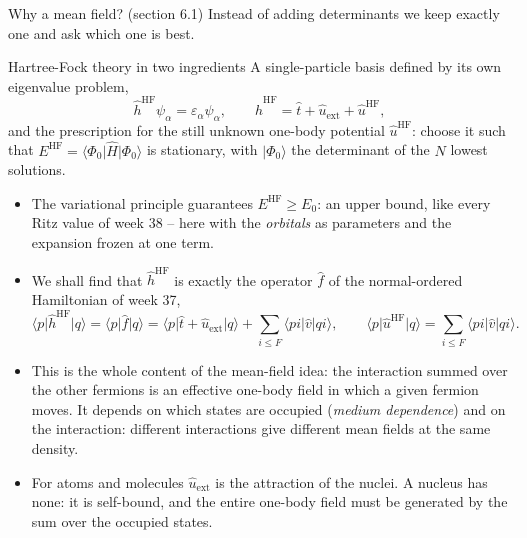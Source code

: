\documentclass[aspectratio=169,10pt]{beamer}
\newcommand{\ket}[1]{\vert #1\rangle}
\newcommand{\bra}[1]{\langle #1\vert}
\newcommand{\element}[3]{\langle #1\vert #2\vert #3\rangle}
\begin{document}
\begin{frame}{Why a mean field? (section 6.1)}
  \footnotesize
  Instead of adding determinants we keep exactly one and ask which one is best.
  \begin{block}{Hartree-Fock theory in two ingredients}
    A single-particle basis defined by its own eigenvalue problem,
    \[
      \hat{h}^{\mathrm{HF}}\psi_\alpha=\varepsilon_\alpha\psi_\alpha,\qquad
      \hat{h}^{\mathrm{HF}}=\hat{t}+\hat{u}_{\mathrm{ext}}+\hat{u}^{\mathrm{HF}},
    \]
    and the prescription for the still unknown one-body potential $\hat{u}^{\mathrm{HF}}$: choose it such that $E^{\mathrm{HF}}=\bra{\Phi_0}\hat{H}\ket{\Phi_0}$ is stationary, with $\ket{\Phi_0}$ the determinant of the $N$ lowest solutions.
  \end{block}
  \begin{itemize}
    \item The variational principle guarantees $E^{\mathrm{HF}}\ge E_0$: an upper bound, like every Ritz value of week 38 -- here with the \emph{orbitals} as parameters and the expansion frozen at one term.
    \item We shall find that $\hat{h}^{\mathrm{HF}}$ is exactly the operator $\hat{f}$ of the normal-ordered Hamiltonian of week 37,
    \[
      \element{p}{\hat{h}^{\mathrm{HF}}}{q}=\element{p}{\hat{f}}{q}=\element{p}{\hat{t}+\hat{u}_{\mathrm{ext}}}{q}+\sum_{i\le F}\element{pi}{\hat{v}}{qi},
      \qquad
      \element{p}{\hat{u}^{\mathrm{HF}}}{q}=\sum_{i\le F}\element{pi}{\hat{v}}{qi}.
    \]
    \item This is the whole content of the mean-field idea: \alert{the interaction summed over the other fermions is an effective one-body field} in which a given fermion moves. It depends on which states are occupied (\emph{medium dependence}) and on the interaction: different interactions give different mean fields at the same density.
    \item For atoms and molecules $\hat{u}_{\mathrm{ext}}$ is the attraction of the nuclei. A nucleus has none: it is self-bound, and the entire one-body field must be generated by the sum over the occupied states.
  \end{itemize}
\end{frame}
\end{document}
